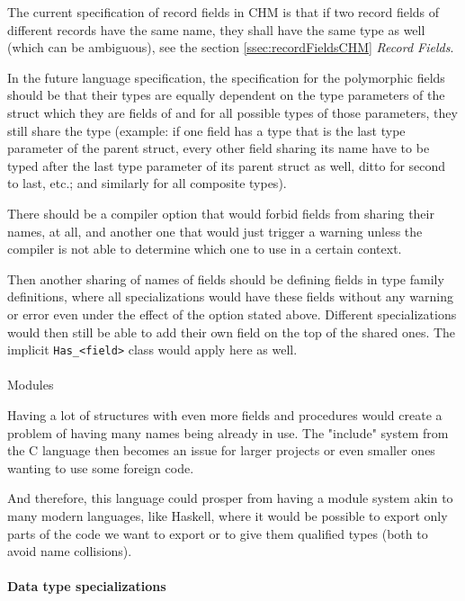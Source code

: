 The current specification of record fields in CHM is that if two record fields of different records have the same name, they shall have the same type as well (which can be ambiguous), see the section \ref{ssec:recordFieldsCHM} \emph{Record Fields}.

In the future language specification, the specification for the polymorphic fields should be that their types are equally dependent on the type parameters of the struct which they are fields of and for all possible types of those parameters, they still share the type (example: if one field has a type that is the last type parameter of the parent struct, every other field sharing its name have to be typed after the last type parameter of its parent struct as well, ditto for second to last, etc.; and similarly for all composite types).

There should be a compiler option that would forbid fields from sharing their names, at all, and another one that would just trigger a warning unless the compiler is not able to determine which one to use in a certain context.

Then another sharing of names of fields should be defining fields in type family definitions, where all specializations would have these fields without any warning or error even under the effect of the option stated above. Different specializations would then still be able to add their own field on the top of the shared ones. The implicit \lstinline{Has_<field>} class would apply here as well.

\paragraph{}{Modules}

Having a lot of structures with even more fields and procedures would create a problem of having many names being already in use. The "include" system from the C language then becomes an issue for larger projects or even smaller ones wanting to use some foreign code.

And therefore, this language could prosper from having a module system akin to many modern languages, like Haskell, where it would be possible to export only parts of the code we want to export or to give them qualified types (both to avoid name collisions).

\paragraph{Data type specializations}

